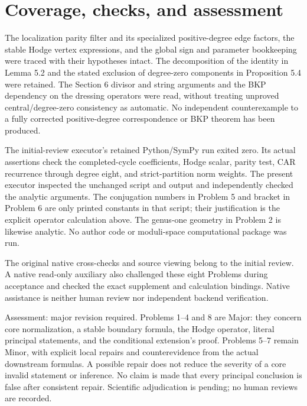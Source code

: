 \documentclass[10pt]{article}
\begin{document}
\section*{Coverage, checks, and assessment}
The localization parity filter and its specialized positive-degree edge factors, the stable Hodge vertex expressions, and the global sign and parameter bookkeeping were traced with their hypotheses intact. The decomposition of the identity in Lemma 5.2 and the stated exclusion of degree-zero components in Proposition 5.4 were retained. The Section 6 divisor and string arguments and the BKP dependency on the dressing operators were read, without treating unproved central/degree-zero consistency as automatic. No independent counterexample to a fully corrected positive-degree correspondence or BKP theorem has been produced.\par
The initial-review executor’s retained Python/SymPy run exited zero. Its actual assertions check the completed-cycle coefficients, Hodge scalar, parity test, CAR recurrence through degree eight, and strict-partition norm weights. The present executor inspected the unchanged script and output and independently checked the analytic arguments. The conjugation numbers in Problem 5 and bracket in Problem 6 are only printed constants in that script; their justification is the explicit operator calculation above. The genus-one geometry in Problem 2 is likewise analytic. No author code or moduli-space computational package was run.\par
The original native cross-checks and source viewing belong to the initial review. A native read-only auxiliary also challenged these eight Problems during acceptance and checked the exact supplement and calculation bindings. Native assistance is neither human review nor independent backend verification.\par
Assessment: major revision required. Problems 1–4 and 8 are Major: they concern core normalization, a stable boundary formula, the Hodge operator, literal principal statements, and the conditional extension’s proof. Problems 5–7 remain Minor, with explicit local repairs and counterevidence from the actual downstream formulas. A possible repair does not reduce the severity of a core invalid statement or inference. No claim is made that every principal conclusion is false after consistent repair. Scientific adjudication is pending; no human reviews are recorded.\par
\end{document}
